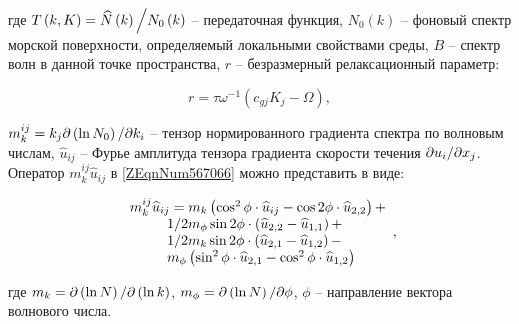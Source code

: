 \noindent где $T\left(k,K\right)={\widehat{N}\left(k\right)\mathord{\left/ {\vphantom {\widehat{N}\left(k\right) N_{0} \left(k\right)}} \right. \kern-\nulldelimiterspace} N_{0} \left(k\right)} $ -- передаточная функция, $N_{0} \left(k\right)$ -- фоновый спектр морской поверхности, определяемый локальными свойствами среды, $B$ -- спектр волн в данной точке пространства, $r$ -- безразмерный релаксационный параметр:



\begin{equation} \label{1.38)} r=\tau \omega ^{-1} \left(c_{gj} K_{j} -\Omega \right),  \end{equation} 



$m_{k}^{ij} =k_{j} {\partial \left(\ln N_{0} \right)\mathord{\left/ {\vphantom {\partial \left(\ln N_{0} \right) \partial k_{i} }} \right. \kern-\nulldelimiterspace} \partial k_{i} } $ -- тензор нормированного градиента спектра по волновым числам, $\widehat{u}_{ij} $ -- Фурье амплитуда тензора градиента скорости течения ${\partial u_{i} \mathord{\left/ {\vphantom {\partial u_{i}  \partial x_{j} }} \right. \kern-\nulldelimiterspace} \partial x_{j} } $. Оператор $m_{k}^{ij} \widehat{u}_{ij} $ в \eqref{ZEqnNum567066} можно представить в виде:



\begin{equation} \label{1.39)} \begin{array}{l} {m_{k}^{ij} \widehat{u}_{ij} =m_{k} \left(\cos ^{2} \phi \cdot \widehat{u}_{ij} -\cos 2\phi \cdot \widehat{u}_{2,2} \right)+} \\ {\qquad \, \, \, \, {1\mathord{\left/ {\vphantom {1 2}} \right. \kern-\nulldelimiterspace} 2} m_{\phi } \sin 2\phi \cdot \left(\widehat{u}_{2,2} -\widehat{u}_{1,1} \right)+} \\ {\qquad \, \, \, \, {1\mathord{\left/ {\vphantom {1 2}} \right. \kern-\nulldelimiterspace} 2} m_{k} \sin 2\phi \cdot \left(\widehat{u}_{2,1} -\widehat{u}_{1,2} \right)-} \\ {\qquad \, \, \, \, m_{\phi } \left(\sin ^{2} \phi \cdot \widehat{u}_{2,1} -\cos ^{2} \phi \cdot \widehat{u}_{1,2} \right)} \end{array},  \end{equation} 



\noindent где $m_{k} ={\partial \left(\ln N\right)\mathord{\left/ {\vphantom {\partial \left(\ln N\right) \partial \left(\ln k\right)}} \right. \kern-\nulldelimiterspace} \partial \left(\ln k\right)} $, $m_{\phi } ={\partial \left(\ln N\right)\mathord{\left/ {\vphantom {\partial \left(\ln N\right) \partial \phi }} \right. \kern-\nulldelimiterspace} \partial \phi } $, $\phi $ -- направление вектора волнового числа.


